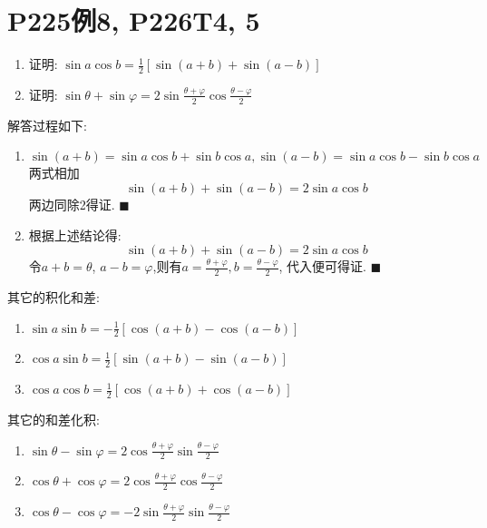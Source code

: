 \documentclass{book}
\begin{document}
    \section{\textcolor[rgb]{0.11,0.65,0.52}{P225例8, P226T4, 5}}
    \begin{boxB}
        \begin{enumerate}
            \item 证明: $\displaystyle \sin a\cos b=\frac{1}{2}[\sin(a+b)+\sin(a-b)]$
            \item 证明: $\displaystyle \sin \theta + \sin \varphi = 2\sin\frac{\theta+\varphi}{2}\cos\frac{\theta-\varphi}{2}$
        \end{enumerate}
    \end{boxB}
    解答过程如下:

    \begin{enumerate}
        \item $$\sin (a+b)=\sin a\cos b+\sin b \cos a, \sin (a-b)=\sin a\cos b-\sin b \cos a$$\textcolor[rgb]{0.75,0.17,0.22}{两式相加}$$\sin(a+b)+\sin(a-b)=2\sin a\cos b$$两边同除2得证. $\blacksquare$
        \item 根据上述结论得:$$\sin(a+b) +\sin(a-b)=2\sin a\cos b$$\textcolor[rgb]{0.75,0.17,0.22}{令$a+b=\theta$, $a-b=\varphi$,则有$\displaystyle a=\frac{\theta+\varphi}{2},b=\frac{\theta-\varphi}{2}$}, 代入便可得证. $\blacksquare$
    \end{enumerate}

    其它的\textcolor[rgb]{0.38,0.11,0.2}{积化和差}:
    \begin{enumerate}
        \item $\displaystyle \sin a\sin b=-\frac{1}{2}[\cos(a+b)-\cos(a-b)]$
        \item $\displaystyle \cos a\sin b=\frac{1}{2}[\sin(a+b)-\sin(a-b)]$
        \item $\displaystyle \cos a\cos b=\frac{1}{2}[\cos(a+b) +\cos(a-b)]$
    \end{enumerate}

    其它的\textcolor[rgb]{0.38,0.11,0.2}{和差化积}:

    \begin{enumerate}
        \item $\displaystyle \sin \theta-\sin \varphi=2\cos\frac{\theta+\varphi}{2}\sin\frac{\theta-\varphi}{2}$
        \item $\displaystyle \cos \theta+\cos \varphi=2\cos \frac{\theta+\varphi}{2} \cos \frac{\theta-\varphi}{2}$
        \item $\displaystyle \cos \theta-\cos \varphi=-2\sin \frac{\theta+\varphi}{2} \sin \frac{\theta-\varphi}{2}$
    \end{enumerate}
\end{document}
